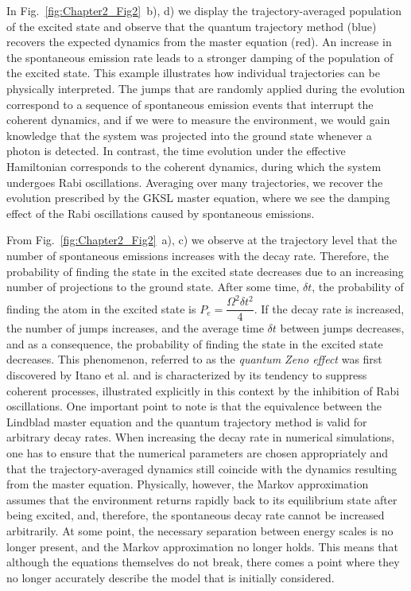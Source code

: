 In Fig.~\ref{fig:Chapter2_Fig2}~b), d) we display the trajectory-averaged population of the excited state and observe that the quantum trajectory method (blue) recovers the expected dynamics from the master equation (red). An increase in the spontaneous emission rate leads to a stronger damping of the population of the excited state. This example illustrates how individual trajectories can be physically interpreted. The jumps that are randomly applied during the evolution correspond to a sequence of spontaneous emission events that interrupt the coherent dynamics, and if we were to measure the environment, we would gain knowledge that the system was projected into the ground state whenever a photon is detected. In contrast, the time evolution under the effective Hamiltonian corresponds to the coherent dynamics, during which the system undergoes Rabi oscillations. Averaging over many trajectories, we recover the evolution prescribed by the GKSL master equation, where we see the damping effect of the Rabi oscillations caused by spontaneous emissions.

From Fig.~\ref{fig:Chapter2_Fig2}~a), c) we observe at the trajectory level that the number of spontaneous emissions increases with the decay rate. Therefore, the probability of finding the state in the excited state decreases due to an increasing number of projections to the ground state. After some time, $\delta t$, the probability of finding the atom in the excited state is $P_e = \dfrac{\Omega^2 \delta t^2}{4}$. If the decay rate is increased, the number of jumps increases, and the average time $\delta t$ between jumps decreases, and as a consequence, the probability of finding the state in the excited state decreases. This phenomenon, referred to as the \textit{quantum Zeno effect} was first discovered by Itano et al. \cite{itano1990} and is characterized by its tendency to suppress coherent processes, illustrated explicitly in this context by the inhibition of Rabi oscillations. One important point to note is that the equivalence between the Lindblad master equation and the quantum trajectory method is valid for arbitrary decay rates. When increasing the decay rate in numerical simulations, one has to ensure that the numerical parameters are chosen appropriately and that the trajectory-averaged dynamics still coincide with the dynamics resulting from the master equation. Physically, however, the Markov approximation assumes that the environment returns rapidly back to its equilibrium state after being excited, and, therefore, the spontaneous decay rate cannot be increased arbitrarily. At some point, the necessary separation between energy scales is no longer present, and the Markov approximation no longer holds. This means that although the equations themselves do not break, there comes a point where they no longer accurately describe the model that is initially considered.

